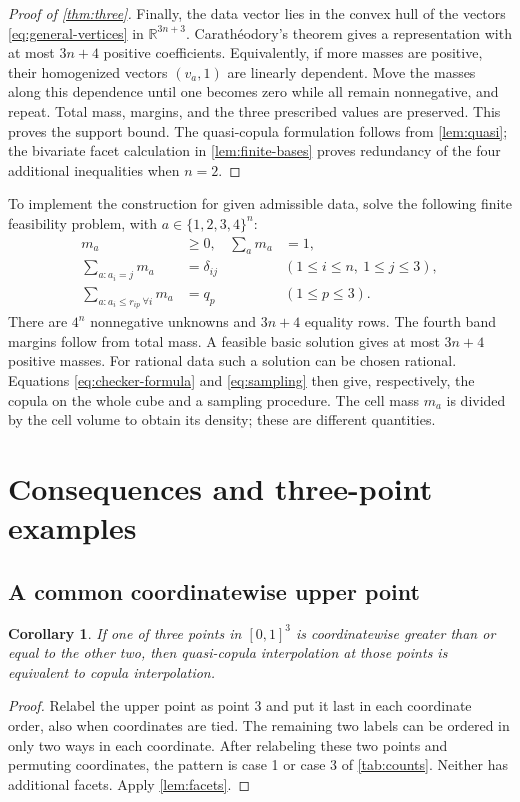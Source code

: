 \documentclass[a4paper,11pt]{amsart}
\numberwithin{equation}{section}
\newtheorem{corollary}[corollary]{Corollary}
\theoremstyle{definition}
\theoremstyle{remark}
\newcommand{\R}{\mathbb R}
\begin{document}
\begin{proof}[Proof of \cref{thm:three}]
Finally, the data vector lies in the convex hull of the vectors
\eqref{eq:general-vertices} in $\R^{3n+3}$. Carath\'eodory's theorem gives
a representation with at most $3n+4$ positive coefficients. Equivalently,
if more masses are positive, their homogenized vectors $(v_a,1)$ are
linearly dependent. Move the masses along this dependence until one becomes
zero while all remain nonnegative, and repeat. Total mass, margins, and
the three prescribed values are preserved. This proves the support bound.
The quasi-copula formulation follows from \cref{lem:quasi}; the bivariate
facet calculation in \cref{lem:finite-bases} proves redundancy of the four
additional inequalities when $n=2$.
\end{proof}

To implement the construction for given admissible data, solve the
following finite feasibility problem, with $a\in\{1,2,3,4\}^n$:
\begin{equation}
 \begin{aligned}
 m_a&\geq0, &\sum_a m_a&=1,\\
 \sum_{a:a_i=j}m_a&=\delta_{ij}
       &&(1\leq i\leq n,\ 1\leq j\leq3),\\
 \sum_{a:a_i\leq r_{ip}\ \forall i}m_a&=q_p
       &&(1\leq p\leq3).
 \end{aligned}\label{eq:construction-lp}
\end{equation}
There are $4^n$ nonnegative unknowns and $3n+4$ equality rows. The fourth
band margins follow from total mass. A feasible basic solution gives
at most $3n+4$ positive masses. For rational data such a solution can be
chosen rational. Equations \eqref{eq:checker-formula} and
\eqref{eq:sampling} then give, respectively, the copula on the whole cube
and a sampling procedure. The cell mass $m_a$ is divided by the cell
volume to obtain its density; these are different quantities.

\section{Consequences and three-point examples}\label{sec:examples}
\subsection{A common coordinatewise upper point}
\begin{corollary}\label{cor:maximum}
If one of three points in $[0,1]^3$ is coordinatewise greater than or equal
to the other two, then quasi-copula interpolation at those points is
equivalent to copula interpolation.
\end{corollary}
\begin{proof}
Relabel the upper point as point $3$ and put it last in each coordinate
order, also when coordinates are tied. The remaining two labels can be
ordered in only two ways in each coordinate. After relabeling these two
points and permuting coordinates, the pattern is case 1 or case 3 of
\cref{tab:counts}. Neither has additional facets. Apply \cref{lem:facets}.
\end{proof}
\end{document}
